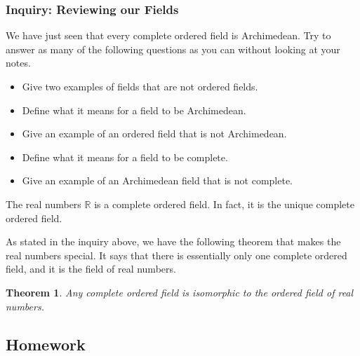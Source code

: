 \documentclass[11pt]{article}
\newenvironment{task}
	{\begin{mdframed}[linecolor=lightgray, linewidth=3pt]\raggedright}
	{\end{mdframed}}
\newtheorem{theorem}{Theorem}[section]
\theoremstyle{definition}
\begin{document}
\subsubsection{Inquiry: Reviewing our Fields}

\begin{task}
  We have just seen that every complete ordered field is Archimedean. Try to answer as many of the following questions as you can
  without looking at your notes.
  \begin{itemize}
    \item Give two examples of fields that are not ordered fields.
    \item Define what it means for a field to be Archimedean.
    \item Give an example of an ordered field that is not Archimedean.
    \item Define what it means for a field to be complete.
    \item Give an example of an Archimedean field that is not complete.
  \end{itemize}
  The real numbers $\mathbb{R}$ is a complete ordered field. In fact, it is the unique complete ordered field.
  
\end{task}

As stated in the inquiry above, we have the following theorem that makes the real numbers special. It says that there is
essentially only one complete ordered field, and it is the field of real numbers.

\begin{theorem}
  Any complete ordered field is isomorphic to the ordered field of real numbers.
  \label{theorem: reals are unique}
\end{theorem}

\newpage \subsection{Homework}  
\end{document}
